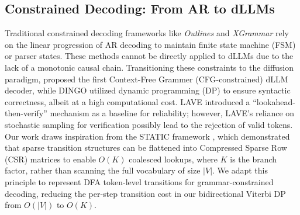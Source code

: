 \subsection{Constrained Decoding: From AR to dLLMs}
Traditional constrained decoding frameworks like \textit{Outlines} \citep{outlines} and \textit{XGrammar} \citep{dong2024xgrammar} rely on the linear progression of AR decoding to maintain finite state machine (FSM) or parser states. These methods cannot be directly applied to dLLMs due to the lack of a monotonic causal chain. 
Transitioning these constraints to the diffusion paradigm, \citet{cd4dllm} proposed the first Context-Free Grammer (CFG-constrained) dLLM decoder, while DINGO \citep{suresh2025dingoconstrainedinferencediffusion} utilized dynamic programming (DP) to ensure syntactic correctness, albeit at a high computational cost. LAVE \citep{zhang2026lookaheadthenverifyreliableconstraineddecoding} introduced a ``lookahead-then-verify'' mechanism as a baseline for reliability; however, LAVE's reliance on stochastic sampling for verification possibly lead to the rejection of valid tokens. Our work draws inspiration from the STATIC framework \citep{su2026vectorizingtrieefficientconstrained}, which demonstrated that sparse transition structures can be flattened into Compressed Sparse Row (CSR) matrices to enable $O(K)$ coalesced lookups, where $K$ is the branch factor, rather than scanning the full vocabulary of size $|V|$. We adapt this principle to represent DFA token-level transitions for grammar-constrained decoding, reducing the per-step transition cost in our bidirectional Viterbi DP from $O(|V|)$ to $O(K)$.



